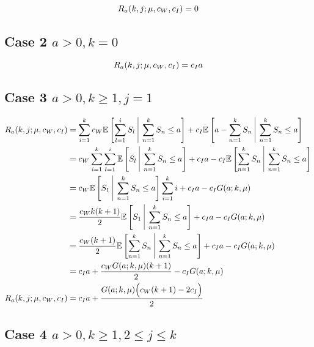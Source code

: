 \documentclass{article}
\begin{document}
\begin{equation*}
	R_{a} (k, j; \mu, c_{W}, c_{I}) = 0 \\
\end{equation*}

\subsection{Case 2 $a > 0, k = 0$}

\begin{equation*}
	R_{a} (k, j; \mu, c_{W}, c_{I}) = c_{I} a \\
\end{equation*}

\subsection{Case 3 $a > 0, k \geq 1, j = 1$}

\begin{align*}
	R_{a} (k, j; \mu, c_{W}, c_{I}) & = \sum_{i = 1}^{k} c_{W} \mathbb{E} \left[ \sum_{l = 1}^{i} S_{l} \ \vline \ \sum_{n = 1}^{k} S_{n} \leq a \right] + c_{I} \mathbb{E} \left[ a - \sum_{n = 1}^{k} S_{n} \ \vline \ \sum_{n = 1}^{k} S_{n} \leq a \right] \\
	& = c_{W} \sum_{i = 1}^{k} \sum_{l = 1}^{i} \mathbb{E} \left[ S_{l} \ \vline \ \sum_{n = 1}^{k} S_{n} \leq a \right] + c_{I} a - c_{I} \mathbb{E} \left[ \sum_{n = 1}^{k} S_{n} \ \vline \ \sum_{n = 1}^{k} S_{n} \leq a \right] \\
	& = c_{W} \mathbb{E} \left[ S_{1} \ \vline \ \sum_{n = 1}^{k} S_{n} \leq a \right] \sum_{i = 1}^{k} i + c_{I} a - c_{I} G (a; k, \mu) \\
	& = \frac{c_{W} k (k + 1)}{2} \mathbb{E} \left[ S_{1} \ \vline \ \sum_{n = 1}^{k} S_{n} \leq a \right] + c_{I} a - c_{I} G (a; k, \mu) \\
	& = \frac{c_{W} (k + 1)}{2} \mathbb{E} \left[ \sum_{n = 1}^{k} S_{n} \ \vline \ \sum_{n = 1}^{k} S_{n} \leq a \right] + c_{I} a - c_{I} G (a; k, \mu) \\
	& = c_{I} a + \frac{c_{W} G (a; k, \mu) (k + 1)}{2} - c_{I} G (a; k, \mu) \\
	R_{a} (k, j; \mu, c_{W}, c_{I}) & = c_{I} a + \frac{G (a; k, \mu) \Big( c_{W} (k + 1) - 2 c_{I} \Big)}{2} \\
\end{align*}

\subsection{Case 4 $a > 0, k \geq 1, 2 \leq j \leq k$}
\end{document}
